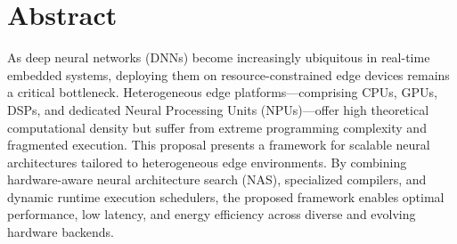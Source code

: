 \section{Abstract}
As deep neural networks (DNNs) become increasingly ubiquitous in real-time embedded systems, deploying them on resource-constrained edge devices remains a critical bottleneck. Heterogeneous edge platforms—comprising CPUs, GPUs, DSPs, and dedicated Neural Processing Units (NPUs)—offer high theoretical computational density but suffer from extreme programming complexity and fragmented execution. This proposal presents a framework for scalable neural architectures tailored to heterogeneous edge environments. By combining hardware-aware neural architecture search (NAS), specialized compilers, and dynamic runtime execution schedulers, the proposed framework enables optimal performance, low latency, and energy efficiency across diverse and evolving hardware backends.
